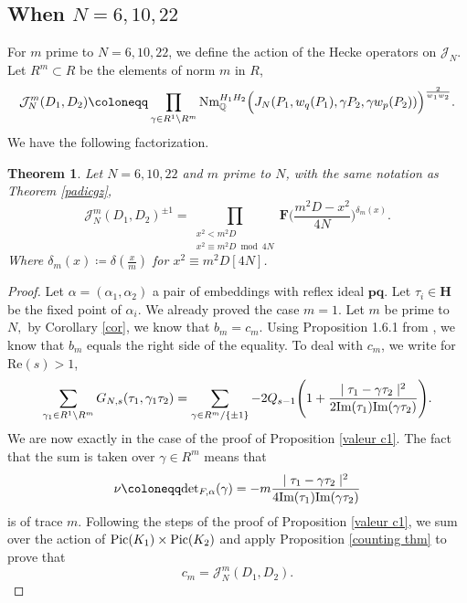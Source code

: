 \documentclass[a4paper,12pt]{article}
\newtheorem{theorem}{Theorem}
\begin{document}
\subsection{\texorpdfstring{When $N=6,10,22$}{When N=6,10,22}}
For $m$ prime to $N=6,10,22$, we define the action of the Hecke operators on $\mathcal{J}_N$. Let $R^m\subset R $ be the elements of norm $m$ in $R$,
\[\mathcal{J}_N^m(D_1,D_2)\coloneqq \prod_{\gamma\in R^1 \backslash R^m}\textup{Nm}_\mathbb{Q}^{H_1H_2}\Bigl(J_N(P_1,w_q(P_1),\gamma P_2,\gamma w_p(P_2))\Bigl)^{\frac{2}{w_1w_2}}.\]
We have the following factorization.
\begin{theorem}\label{Hecke}
    Let $N=6,10,22$ and $m$ prime to $N$, with the same notation as Theorem \ref{padicgz},
\begin{equation}
\mathcal{J}_N^m(D_1,D_2)^{\pm1}=\prod_{\substack{x^2<m^2D\\x^2\equiv m^2D \bmod{4N}}}\mathbf{F}\biggl(\frac{m^2D-x^2}{4N}\biggl)^{\delta_m(x)}.
\end{equation}
Where $\delta_m(x)\coloneqq \delta(\frac{x}{m})$ for $x^2\equiv m^2D [4N]$.
\end{theorem}
\begin{proof}
Let $\alpha=(\alpha_1,\alpha_2)$ a pair of embeddings with reflex ideal $\mathbf{pq}$. Let $\tau_i\in \mathbf{H}$ be the fixed point of $\alpha_i$. 
   We already proved the case $m=1$. Let $m$ be prime to $N,$ by Corollary \ref{cor}, we know that $b_m=c_m$. Using Proposition 1.6.1 from \cite{Daas}, we know that $b_m$ equals the right side of the equality.
  To deal with $c_m$, we write for Re$(s)>1$,
   \begin{equation}
   \begin{split}
   \sum_{\gamma_1\in R^1 \backslash R^m}G_{N,s}(\tau_1,\gamma_1\tau_2)=\sum_{\gamma\in R^m/\{\pm1\}}-2Q_{s-1}\Biggl(1+\frac{\mid \tau_1-\gamma\tau_2\mid^2}{2\text{\normalfont{Im}}(\tau_1)\text{\normalfont{Im}}(\gamma\tau_2)}\Biggl).
    \end{split}
   \end{equation}
  We are now exactly in the case of the proof of Proposition \ref{valeur c1}. The fact that the sum is taken over $\gamma\in R^m$ means that 
  \begin{equation}
\nu\coloneqq \textup{det}_{F,\alpha}(\gamma)=-m\frac{\mid \tau_1-\gamma\tau_2\mid^2}{4\text{\normalfont{Im}}(\tau_1)\text{\normalfont{Im}}(\gamma\tau_2)}
\end{equation}
  is of trace $m$. Following the steps of the proof of Proposition \ref{valeur c1}, we sum over the action of $\textup{Pic}(K_1)\times\textup{Pic}(K_2)$ and apply Proposition \ref{counting thm} to prove that \begin{equation}
c_m=\mathcal{J}_N^m(D_1,D_2).
\end{equation}
\end{proof}
\end{document}
